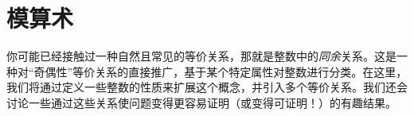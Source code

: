 \section{模算术}

你可能已经接触过一种自然且常见的等价关系，那就是整数中的\emph{同余}关系。这是一种对``奇偶性''等价关系的直接推广，基于某个特定属性对整数进行分类。在这里，我们将通过定义一些整数的性质来扩展这个概念，并引入多个等价关系。我们还会讨论一些通过这些关系使问题变得更容易证明（或变得可证明！）的有趣结果。









